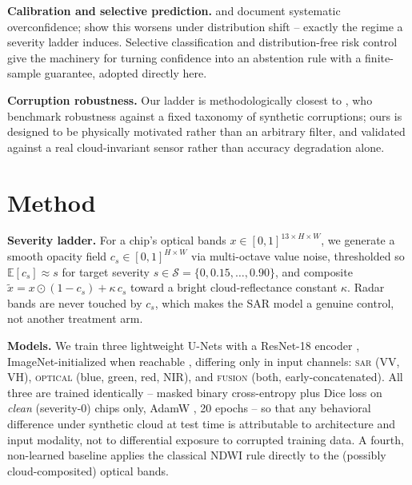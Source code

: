 \documentclass{article}
\begin{document}
\textbf{Calibration and selective prediction.} \citet{guo2017calibration} and \citet{minderer2021revisiting} document systematic overconfidence; \citet{ovadia2019trust} show this worsens under distribution shift -- exactly the regime a severity ladder induces. Selective classification \citep{geifman2017selective} and distribution-free risk control \citep{bates2021distribution} give the machinery for turning confidence into an abstention rule with a finite-sample guarantee, adopted directly here.

\textbf{Corruption robustness.} Our ladder is methodologically closest to \citet{hendrycks2019benchmarking}, who benchmark robustness against a fixed taxonomy of synthetic corruptions; ours is designed to be physically motivated rather than an arbitrary filter, and validated against a real cloud-invariant sensor rather than accuracy degradation alone.

\section{Method}
\label{sec:method}

\textbf{Severity ladder.} For a chip's optical bands $x \in [0,1]^{13 \times H \times W}$, we generate a smooth opacity field $c_s \in [0,1]^{H\times W}$ via multi-octave value noise, thresholded so $\mathbb{E}[c_s] \approx s$ for target severity $s \in \mathcal{S} = \{0, 0.15, \ldots, 0.90\}$, and composite $\tilde x = x \odot (1-c_s) + \kappa\, c_s$ toward a bright cloud-reflectance constant $\kappa$. Radar bands are never touched by $c_s$, which makes the SAR model a genuine control, not another treatment arm.

\textbf{Models.} We train three lightweight U-Nets \citep{ronneberger2015unet} with a ResNet-18 encoder \citep{he2016deep}, ImageNet-initialized when reachable \citep{deng2009imagenet}, differing only in input channels: \textsc{sar} (VV, VH), \textsc{optical} (blue, green, red, NIR), and \textsc{fusion} (both, early-concatenated). All three are trained identically -- masked binary cross-entropy plus Dice loss \citep{milletari2016vnet} on \emph{clean} (severity-0) chips only, AdamW \citep{loshchilov2019decoupled}, 20 epochs -- so that any behavioral difference under synthetic cloud at test time is attributable to architecture and input modality, not to differential exposure to corrupted training data. A fourth, non-learned baseline applies the classical NDWI rule \citep{mcfeeters1996ndwi} directly to the (possibly cloud-composited) optical bands.
\end{document}
